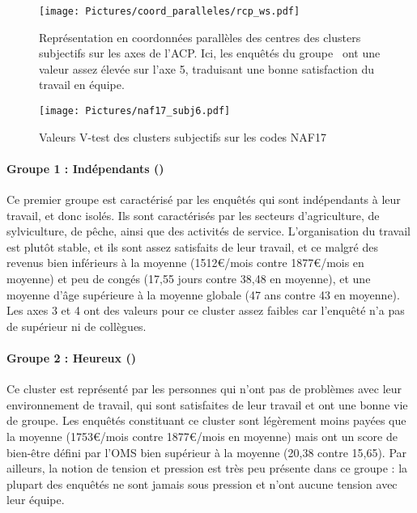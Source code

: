 \documentclass[11pt,fleqn,openany,frenchb]{book} %
\begin{document}
\begin{figure}[!h]
\centering
  \texttt{[image: Pictures/coord\_paralleles/rcp\_ws.pdf]}
\caption{{Représentation en coordonnées parallèles des centres des clusters subjectifs sur les axes de l'ACP. Ici, les enquêtés du groupe \HEUR\ ont une valeur assez élevée sur l'axe 5, traduisant une bonne satisfaction du travail en équipe.}}
\label{fig:CPsubj}
\end{figure}

\begin{figure}[!h]
\centering
  \texttt{[image: Pictures/naf17\_subj6.pdf]}
\caption{Valeurs V-test des clusters subjectifs sur les codes NAF17}
\label{fig:nafsubj}
\end{figure}

\paragraph{Groupe 1 : Indépendants (\INDEP)\\}
Ce premier groupe est caractérisé par les enquêtés qui sont indépendants à leur travail, et donc isolés. Ils sont caractérisés par les secteurs d'agriculture,  de sylviculture, de pêche, ainsi que des activités de service. L'organisation du travail est plutôt stable, et ils sont assez satisfaits de leur travail, et ce malgré des revenus bien inférieurs à la moyenne (1512\euro{}/mois contre 1877\euro{}/mois en moyenne) et peu de congés (17,55 jours contre 38,48 en moyenne), et une moyenne d'âge supérieure à la moyenne globale (47 ans contre 43 en moyenne). Les axes 3 et 4 ont des valeurs pour ce cluster assez faibles car l'enquêté n'a pas de supérieur ni de collègues.

\paragraph{Groupe 2 : Heureux (\HEUR)\\}
Ce cluster est représenté par les personnes qui n'ont pas de problèmes avec leur environnement de travail, qui sont satisfaites de leur travail et ont une bonne vie de groupe. Les enquêtés constituant ce cluster sont légèrement moins payées que la moyenne (1753\euro{}/mois contre 1877\euro{}/mois en moyenne) mais ont un score de bien-être défini par l'OMS bien supérieur à la moyenne (20,38 contre 15,65). Par ailleurs, la notion de tension et pression est très peu présente dans ce groupe : la plupart des enquêtés ne sont jamais sous pression et n'ont aucune tension avec leur équipe.
\end{document}
